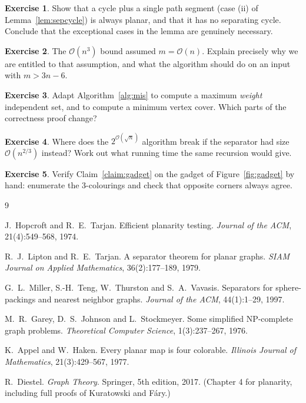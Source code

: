 \documentclass[11pt,a4paper]{article}
\theoremstyle{plain}
\theoremstyle{definition}
\newtheorem{exercise}{Exercise}
\theoremstyle{remark}
\newcommand{\bigoh}[1]{\mathcal{O}\!\left(#1\right)}
\begin{document}
\begin{exercise}
Show that a cycle plus a single path segment (case (ii) of
Lemma~\ref{lem:sepcycle}) is always planar, and that it has no separating
cycle. Conclude that the exceptional cases in the lemma are genuinely
necessary.
\end{exercise}

\begin{exercise}
The $\bigoh{n^3}$ bound assumed $m = \bigoh{n}$. Explain precisely why we are
entitled to that assumption, and what the algorithm should do on an input with
$m > 3n-6$.
\end{exercise}

\begin{exercise}
Adapt Algorithm~\ref{alg:mis} to compute a maximum \emph{weight} independent
set, and to compute a minimum vertex cover. Which parts of the correctness
proof change?
\end{exercise}

\begin{exercise}
Where does the $2^{\bigoh{\sqrt n}}$ algorithm break if the separator had size
$\bigoh{n^{2/3}}$ instead? Work out what running time the same recursion would
give.
\end{exercise}

\begin{exercise}
Verify Claim~\ref{claim:gadget} on the gadget of Figure~\ref{fig:gadget} by
hand: enumerate the $3$-colourings and check that opposite corners always
agree.
\end{exercise}

\begin{thebibliography}{9}

J.~Hopcroft and R.~E.~Tarjan.
\newblock Efficient planarity testing.
\newblock \emph{Journal of the ACM}, 21(4):549--568, 1974.

R.~J.~Lipton and R.~E.~Tarjan.
\newblock A separator theorem for planar graphs.
\newblock \emph{SIAM Journal on Applied Mathematics}, 36(2):177--189, 1979.

G.~L.~Miller, S.-H.~Teng, W.~Thurston and S.~A.~Vavasis.
\newblock Separators for sphere-packings and nearest neighbor graphs.
\newblock \emph{Journal of the ACM}, 44(1):1--29, 1997.

M.~R.~Garey, D.~S.~Johnson and L.~Stockmeyer.
\newblock Some simplified NP-complete graph problems.
\newblock \emph{Theoretical Computer Science}, 1(3):237--267, 1976.

K.~Appel and W.~Haken.
\newblock Every planar map is four colorable.
\newblock \emph{Illinois Journal of Mathematics}, 21(3):429--567, 1977.

R.~Diestel.
\newblock \emph{Graph Theory}.
\newblock Springer, 5th edition, 2017.
\newblock (Chapter 4 for planarity, including full proofs of Kuratowski and
Fáry.)

\end{thebibliography}
\end{document}
